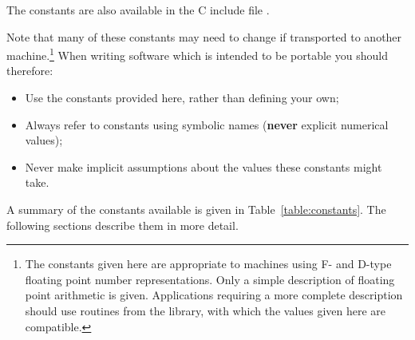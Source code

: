 The constants are also available in the C include file .

Note that many of these constants may need to change if transported to
another machine.\footnote{
The constants given here are appropriate to  machines using F- and
D-type floating point number representations. 
Only a simple description of floating point arithmetic is given.
Applications requiring a more complete description should use routines
from the  library, with which the values given here are compatible.}
When writing software which is intended to be portable you should therefore:

\begin{itemize}

\item Use the constants provided here, rather than defining your own;

\item Always refer to constants using symbolic names ({\bf never} explicit
numerical values);

\item Never make implicit assumptions about the values these constants might
take. 

\end{itemize}

A summary of the constants available is given in
Table~\ref{table:constants}.
The following sections describe them in more detail.

